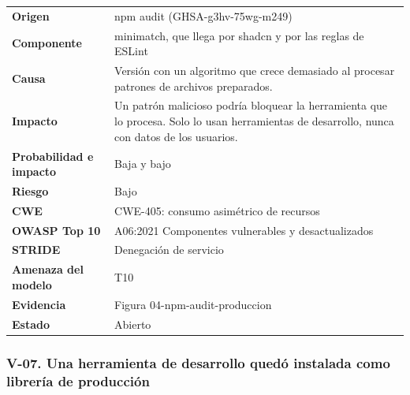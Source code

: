 \documentclass[12pt, letterpaper]{article}
\begin{document}
\begingroup\small\setlength{\tabcolsep}{4pt}\renewcommand{\arraystretch}{1.25}
\begin{longtable}{L{0.24}L{0.70}}
\toprule
\endfirsthead
\toprule
\endhead
\bottomrule
\endfoot
\textbf{Origen} & npm audit (GHSA-g3hv-75wg-m249) \\
\textbf{Componente} & minimatch, que llega por shadcn y por las reglas de ESLint \\
\textbf{Causa} & Versión con un algoritmo que crece demasiado al procesar patrones de archivos preparados. \\
\textbf{Impacto} & Un patrón malicioso podría bloquear la herramienta que lo procesa. Solo lo usan herramientas de desarrollo, nunca con datos de los usuarios. \\
\textbf{Probabilidad e impacto} & Baja y bajo \\
\textbf{Riesgo} & Bajo \\
\textbf{CWE} & CWE-405: consumo asimétrico de recursos \\
\textbf{OWASP Top 10} & A06:2021 Componentes vulnerables y desactualizados \\
\textbf{STRIDE} & Denegación de servicio \\
\textbf{Amenaza del modelo} & T10 \\
\textbf{Evidencia} & Figura 04-npm-audit-produccion \\
\textbf{Estado} & Abierto \\
\end{longtable}
\endgroup

\subsubsection*{V-07. Una herramienta de desarrollo quedó instalada como librería de producción}
\end{document}
